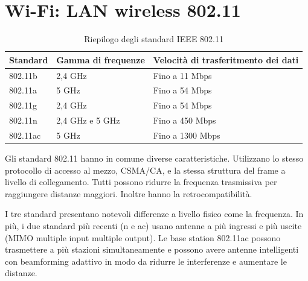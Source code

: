 \documentclass[11pt,a4paper]{book}
\begin{document}
\section{Wi-Fi: LAN wireless 802.11}
\begin{table}[]
	\begin{tabular}{|l|l|l|}
		\hline
		\multicolumn{1}{|c|}{\textbf{Standard}} & \multicolumn{1}{c|}{\textbf{Gamma di frequenze}} & \multicolumn{1}{c|}{\textbf{Velocità di trasferitmento dei dati}} \\ \hline
		802.11b                                 & 2,4 GHz                                          & Fino a 11 Mbps                                                    \\ \hline
		802.11a                                 & 5 GHz                                            & Fino a 54 Mbps                                                    \\ \hline
		802.11g                                 & 2,4 GHz                                          & Fino a 54 Mbps                                                    \\ \hline
		802.11n                                 & 2,4 GHz e 5 GHz                                  & Fino a 450 Mbps                                                   \\ \hline
		802.11ac                                & 5 GHz                                            & Fino a 1300 Mbps                                                  \\ \hline
	\end{tabular}
	\caption{Riepilogo degli standard IEEE 802.11}
	\label{tab: 005}
\end{table}
Gli standard 802.11 hanno in comune diverse caratteristiche. Utilizzano lo stesso protocollo di accesso al mezzo, CSMA/CA, e la stessa struttura del frame a livello di collegamento. Tutti possono ridurre la frequenza trasmissiva per raggiungere distanze maggiori. Inoltre hanno la retrocompatibilità.

I tre standard presentano notevoli differenze a livello fisico come la frequenza. In più, i due standard più recenti (n e ac) usano antenne a più ingressi e più uscite (MIMO multiple input multiple output). Le base station 802.11ac possono trasmettere a più stazioni simultaneamente e possono avere antenne intelligenti con beamforming adattivo in modo da ridurre le interferenze e aumentare le distanze.
\end{document}
